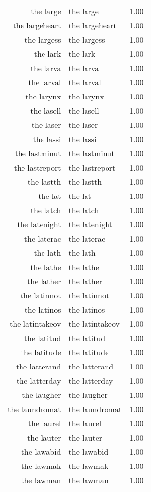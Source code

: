 \begin{table}[ht]
\begin{tabular}{rlr}
  the large & the large & 1.00 \\ 
  the largeheart & the largeheart & 1.00 \\ 
  the largess & the largess & 1.00 \\ 
  the lark & the lark & 1.00 \\ 
  the larva & the larva & 1.00 \\ 
  the larval & the larval & 1.00 \\ 
  the larynx & the larynx & 1.00 \\ 
  the lasell & the lasell & 1.00 \\ 
  the laser & the laser & 1.00 \\ 
  the lassi & the lassi & 1.00 \\ 
  the lastminut & the lastminut & 1.00 \\ 
  the lastreport & the lastreport & 1.00 \\ 
  the lastth & the lastth & 1.00 \\ 
  the lat & the lat & 1.00 \\ 
  the latch & the latch & 1.00 \\ 
  the latenight & the latenight & 1.00 \\ 
  the laterac & the laterac & 1.00 \\ 
  the lath & the lath & 1.00 \\ 
  the lathe & the lathe & 1.00 \\ 
  the lather & the lather & 1.00 \\ 
  the latinnot & the latinnot & 1.00 \\ 
  the latinos & the latinos & 1.00 \\ 
  the latintakeov & the latintakeov & 1.00 \\ 
  the latitud & the latitud & 1.00 \\ 
  the latitude & the latitude & 1.00 \\ 
  the latterand & the latterand & 1.00 \\ 
  the latterday & the latterday & 1.00 \\ 
  the laugher & the laugher & 1.00 \\ 
  the laundromat & the laundromat & 1.00 \\ 
  the laurel & the laurel & 1.00 \\ 
  the lauter & the lauter & 1.00 \\ 
  the lawabid & the lawabid & 1.00 \\ 
  the lawmak & the lawmak & 1.00 \\ 
  the lawman & the lawman & 1.00 \\ 

\end{tabular}
\end{table}
